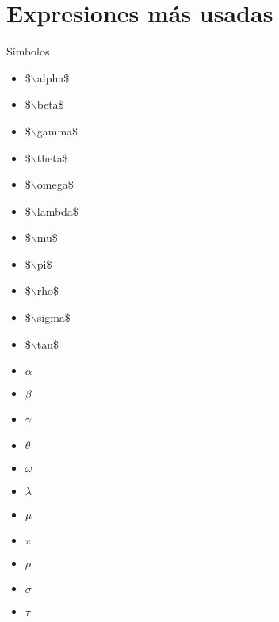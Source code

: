 \documentclass{beamer}
\begin{document}
\section{Expresiones más usadas}
\begin{frame}{Símbolos}
\begin{minipage}[t][0.8\textheight][t]{\dimexpr0.5\textwidth-5pt\relax}
\begin{itemize}
\item \$$\backslash$alpha\$ \\
\item \$$\backslash$beta\$ \\
\item \$$\backslash$gamma\$ \\
\item \$$\backslash$theta\$ \\
\item \$$\backslash$omega\$ \\
\item \$$\backslash$lambda\$ \\
\item \$$\backslash$mu\$ \\
\item \$$\backslash$pi\$ \\
\item \$$\backslash$rho\$ \\ 
\item \$$\backslash$sigma\$ \\
\item \$$\backslash$tau\$
\end{itemize}
\end{minipage}\hfill
\begin{minipage}[t][0.8\textheight][t]{\dimexpr0.5\textwidth-5pt\relax}
\begin{itemize}
\item $\alpha$
\item $\beta$
\item $\gamma$
\item $\theta$
\item $\omega$
\item $\lambda$
\item $\mu$
\item $\pi$
\item $\rho$
\item $\sigma$
\item $\tau$
\end{itemize}
\end{minipage}
\end{frame}
\end{document}
